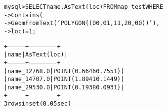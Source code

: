 \begin{alltt}
 mysql> SELECT name, AsText(loc) FROM map_test WHERE
    -> Contains( 
    -> GeomFromText('POLYGON((0 0, 0 1, 1 1, 2 0, 0 0))'), 
    -> loc) = 1;

+--------------+----------------------+
| name         | AsText(loc)          |
+--------------+----------------------+
| name_12768.0 | POINT(0.6646 0.7551) |
| name_14707.0 | POINT(1.8941 0.1449) |
| name_29530.0 | POINT(0.1938 0.0931) |
+--------------+----------------------+
3 rows in set (0.05 sec)
\end{alltt}

